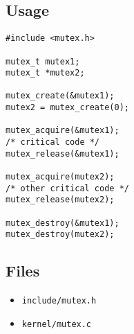 \subsection{Usage}
\begin{lstlisting}
#include <mutex.h>

mutex_t mutex1;
mutex_t *mutex2;

mutex_create(&mutex1);
mutex2 = mutex_create(0);

mutex_acquire(&mutex1);
/* critical code */
mutex_release(&mutex1);

mutex_acquire(mutex2);
/* other critical code */
mutex_release(mutex2);

mutex_destroy(&mutex1);
mutex_destroy(mutex2);

\end{lstlisting}


\subsection{Files}
\begin{itemize}
\item \texttt{include/mutex.h}
\item \texttt{kernel/mutex.c}
\end{itemize}
